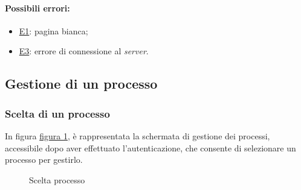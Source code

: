 \paragraph*{Possibili errori:}
\begin{itemize}
\item \hyperref[e1]{E1}: pagina bianca;
\item \hyperref[e3]{E3}: errore di connessione al \textit{server}.
\end{itemize}


\subsection{Gestione di un processo}
\label{gestione}

\subsubsection{Scelta di un processo}

In figura \hyperref[fig:Fprocesses]{figura \ref{fig:Fprocesses}}, è rappresentata la schermata di gestione dei processi, accessibile dopo aver effettuato l'autenticazione, che consente di selezionare un processo per gestirlo.

\begin{figure}[H] \centering 
{} \caption{Scelta processo}
\label{fig:Fprocesses}
\end{figure}

